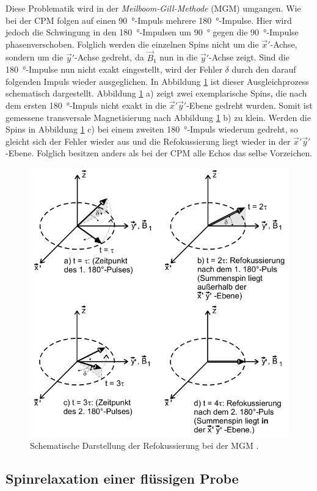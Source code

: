 Diese Problematik wird in der \emph{Meilboom-Gill-Methode} (MGM)
umgangen.
Wie bei der CPM folgen auf einen \SI{90}{\degree}-Impuls mehrere \SI{180}{\degree}-Impulse.
Hier wird jedoch die Schwingung in den \SI{180}{\degree}-Impulsen
um \SI{90}{\degree} gegen die \SI{90}{\degree}-Impulse phasenverschoben.
Folglich werden die einzelnen Spins nicht um die $\vec{x}'$-Achse,
sondern um die $\vec{y}'$-Achse gedreht, da $\vec{B}_1$ nun in die $\vec{y}'$-Achse zeigt.
Sind die \SI{180}{\degree}-Impulse nun nicht exakt eingestellt,
wird der Fehler $\delta$ durch den darauf folgenden Impuls wieder ausgeglichen.
In Abbildung \ref{fig:Meilboom-Gill-Methode} ist dieser Ausgleichprozess schematisch
dargestellt.
Abbildung \ref{fig:Meilboom-Gill-Methode} a) zeigt zwei exemplarische Spins,
die nach dem ersten \SI{180}{\degree}-Impuls
nicht exakt in die $\vec{x}' \vec{y}'$-Ebene gedreht wurden.
Somit ist gemessene transversale Magnetisierung
nach Abbildung \ref{fig:Meilboom-Gill-Methode} b) zu klein.
Werden die Spins in Abbildung \ref{fig:Meilboom-Gill-Methode} c) bei einem zweiten
\SI{180}{\degree}-Impuls wiederum gedreht, so gleicht sich der Fehler
wieder aus und die Refokussierung liegt wieder in der $\vec{x}' \vec{y}'$-Ebene.
Folglich besitzen anders als bei der CPM alle Echos das selbe Vorzeichen.
\begin{figure}
  \centering
  \includegraphics[width=.7\textwidth]{images/meilboom-gill.pdf}
  \caption{Schematische Darstellung der Refokussierung bei der MGM \cite[12]{anleitung}.}
  \label{fig:Meilboom-Gill-Methode}
\end{figure}


\subsection{Spinrelaxation einer flüssigen Probe}
\label{sec:DiffusionTheo}

